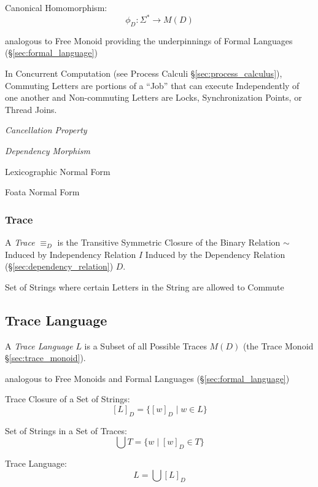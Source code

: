 Canonical Homomorphism:
\[
  \phi_D : \Sigma^* \rightarrow M(D)
\]

analogous to Free Monoid providing the underpinnings of Formal
Languages (\S\ref{sec:formal_language})

In Concurrent Computation (see Process Calculi
\S\ref{sec:process_calculus}), Commuting Letters are portions of a
``Job'' that can execute Independently of one another and
Non-commuting Letters are Locks, Synchronization Points, or Thread
Joins. %

\emph{Cancellation Property}

\emph{Dependency Morphism}

Lexicographic Normal Form

Foata Normal Form



\subsubsection{Trace}\label{sec:trace}

A \emph{Trace} $\equiv_D$ is the Transitive Symmetric Closure of the
Binary Relation $\sim$ Induced by Independency Relation $I$ Induced by
the Dependency Relation (\S\ref{sec:dependency_relation}) $D$.

Set of Strings where certain Letters in the String are allowed to
Commute



\subsection{Trace Language}\label{sec:trace_language}

A \emph{Trace Language} $L$ is a Subset of all Possible Traces $M(D)$
(the Trace Monoid \S\ref{sec:trace_monoid}).

analogous to Free Monoids and Formal Languages
(\S\ref{sec:formal_language})

Trace Closure of a Set of Strings:
\[
  [L]_D = \{[w]_D \mid w \in L\}
\]

Set of Strings in a Set of Traces:
\[
  \bigcup T = \{w \mid [w]_D \in T\}
\]

Trace Language:
\[
  L = \bigcup [L]_D
\]



